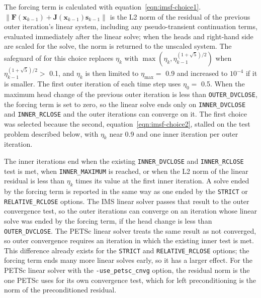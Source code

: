 The forcing term is calculated with equation~\ref{eqn:imsf-choice1}. $\| \mathbf{F}(\mathbf{x}_{k-1}) + \mathbf{J}(\mathbf{x}_{k-1}) \mathbf{s}_{k-1} \|$ is the L2 norm of the residual of the previous outer iteration's linear system, including any pseudo-transient continuation terms, evaluated immediately after the linear solve; when the heads and right-hand side are scaled for the solve, the norm is returned to the unscaled system. The safeguard of \cite{eisenstat1996forcing} for this choice replaces $\eta_k$ with $\max(\eta_k, \eta_{k-1}^{(1+\sqrt{5})/2})$ when $\eta_{k-1}^{(1+\sqrt{5})/2} >$ 0.1, and $\eta_k$ is then limited to $\eta_{\max} =$ 0.9 and increased to $10^{-4}$ if it is smaller. The first outer iteration of each time step uses $\eta_0 =$ 0.5. When the maximum head change of the previous outer iteration is less than \texttt{OUTER\_DVCLOSE}, the forcing term is set to zero, so the linear solve ends only on \texttt{INNER\_DVCLOSE} and \texttt{INNER\_RCLOSE} and the outer iterations can converge on it. The first choice was selected because the second, equation~\ref{eqn:imsf-choice2}, stalled on the test problem described below, with $\eta_k$ near 0.9 and one inner iteration per outer iteration.

The inner iterations end when the existing \texttt{INNER\_DVCLOSE} and \texttt{INNER\_RCLOSE} test is met, when \texttt{INNER\_MAXIMUM} is reached, or when the L2 norm of the linear residual is less than $\eta_k$ times its value at the first inner iteration. A solve ended by the forcing term is reported in the same way as one ended by the \texttt{STRICT} or \texttt{RELATIVE\_RCLOSE} options. The IMS linear solver passes that result to the outer convergence test, so the outer iterations can converge on an iteration whose linear solve was ended by the forcing term, if the head change is less than \texttt{OUTER\_DVCLOSE}. The PETSc linear solver treats the same result as not converged, so outer convergence requires an iteration in which the existing inner test is met. This difference already exists for the \texttt{STRICT} and \texttt{RELATIVE\_RCLOSE} options; the forcing term ends many more linear solves early, so it has a larger effect. For the PETSc linear solver with the \texttt{-use\_petsc\_cnvg} option, the residual norm is the one PETSc uses for its own convergence test, which for left preconditioning is the norm of the preconditioned residual.

